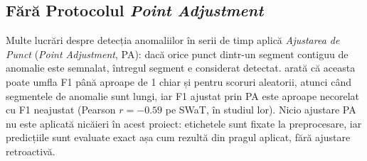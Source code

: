 \subsection{Fără Protocolul \emph{Point Adjustment}}

Multe lucrări despre detecția anomaliilor în serii de timp aplică \emph{Ajustarea de Punct} (\emph{Point Adjustment}, PA): dacă orice punct dintr-un segment contiguu de anomalie este semnalat, întregul segment e considerat detectat.
\textcite{kim2022rigorous} arată că aceasta poate umfla F1 până aproape de 1 chiar și pentru scoruri aleatorii, atunci când segmentele de anomalie sunt lungi, iar F1 ajustat prin PA este aproape necorelat cu F1 neajustat (Pearson $r=-0.59$ pe SWaT, în studiul lor). Nicio ajustare PA nu este aplicată nicăieri în acest proiect: etichetele sunt fixate la preprocesare, iar predicțiile sunt evaluate exact așa cum rezultă din pragul aplicat, fără ajustare retroactivă.